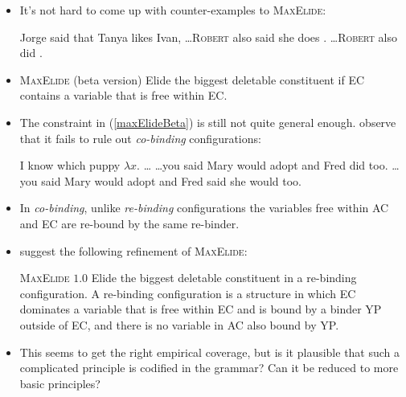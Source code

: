 \documentclass[nofonts,nobib]{tufte-handout}
\begin{document}
\begin{itemize}

  \item It's not hard to come up with counter-examples to \textsc{MaxElide}:

    \pex Jorge said that Tanya likes Ivan,
    \a \ldots \textsc{Robert} also said she does .
    \a \ldots \textsc{Robert} also did .
    \xe
    
  \item {}
    
    \ex\label{maxElideBeta}
    \textsc{MaxElide} (beta version)\newline
    Elide the biggest deletable constituent if EC contains a variable that is free within EC.
    \xe
    
  \item The constraint in (\ref{maxElideBeta}) is still not quite general enough. \citet{fox_maxelide_2005} observe that it fails to rule out \emph{co-binding} configurations:
    
    \pex\label{cobinding}I know which puppy \( λ x .  \) \ldots
    \a\label{cobinding1}\ldots you said Mary would adopt\newline
    and Fred did  too.
    \a\label{cobinding2}\ldots you said Mary would adopt\newline
    and Fred said she would  too.
    \xe
    
  \item In \emph{co-binding}, unlike \emph{re-binding} configurations the variables free within AC and EC are re-bound by the same re-binder.
    
  \item \citet{fox_maxelide_2005} suggest the following refinement of \textsc{MaxElide}:

    \ex
    \label{final}\textsc{MaxElide} \(1.0\)\newline
    Elide the biggest deletable constituent in a re-binding configuration.\newline
    A re-binding configuration is a structure in which EC dominates a variable that is free within EC and is bound by a binder YP outside of EC, and there is no variable in AC also bound by YP.
    \xe
    
  \item This seems to get the right empirical coverage, but is it plausible that such a complicated principle is codified in the grammar? Can it be reduced to more basic principles?
    
\end{itemize}
    
\end{document}
